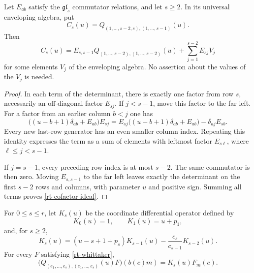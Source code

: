 \begin{lemma}\label{rt-cofactor-reduction}
Let $E_{ab}$ satisfy the $\mathfrak{gl}_s$ commutator
relations, and let $s\geq2$.
In its universal enveloping algebra, put
\[
 C_s(u)=Q_{(1,\ldots,s-2,s),(1,\ldots,s-1)}(u).
\]
Then
\begin{equation}\label{rt-cofactor-ideal}
 C_s(u)=E_{s,s-1}Q_{(1,\ldots,s-2),(1,\ldots,s-2)}(u)
                  +\sum_{j=1}^{s-2}E_{sj}V_j
\end{equation}
for some elements $V_j$ of the enveloping algebra.
No assertion about the values of the $V_j$ is needed.
\end{lemma}

\begin{proof}
In each term of the determinant, there is exactly
one factor from row $s$, necessarily an off-diagonal
factor $E_{sj}$.  If $j<s-1$, move this factor to
the far left.  For a factor from an earlier column
$b<j$ one has
\[
 \bigl((u-b+1)\delta_{ab}+E_{ab}\bigr)E_{sj}
  =E_{sj}\bigl((u-b+1)\delta_{ab}+E_{ab}\bigr)
                                  -\delta_{aj}E_{sb}.
\]
Every new last-row generator has an even smaller
column index.  Repeating this identity expresses
the term as a sum of elements with leftmost factor
$E_{s\ell}$, where $\ell\leq j<s-1$.

If $j=s-1$, every preceding row index is at most
$s-2$.  The same commutator is then zero.
Moving $E_{s,s-1}$ to the far left leaves exactly
the determinant on the first $s-2$ rows and
columns, with parameter $u$ and positive sign.
Summing all terms proves \eqref{rt-cofactor-ideal}.
\end{proof}

\begin{proposition}\label{rt-raw-toda}
For $0\leq s\leq r$, let $K_s(u)$ be the
coordinate differential operator defined by
\[
 K_0(u)=1,\qquad K_1(u)=u+p_1,
\]
and, for $s\geq2$,
\begin{equation}\label{rt-K-rec}
 K_s(u)=(u-s+1+p_s)K_{s-1}(u)
                      -\frac{c_s}{c_{s-1}}K_{s-2}(u).
\end{equation}
For every $F$ satisfying \eqref{rt-whittaker},
\begin{equation}\label{rt-raw-identity}
 \bigl(Q_{(e_1,\ldots,e_s),(e_1,\ldots,e_s)}(u)F\bigr)
                (b(c)m)=K_s(u)F_m(c).
\end{equation}
\end{proposition}


